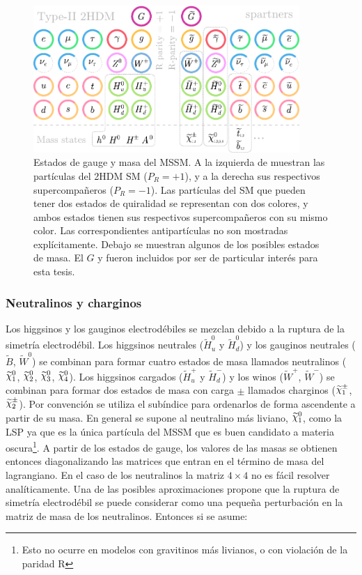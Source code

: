 \begin{figure}
  \centering
  \includegraphics[width=0.9\textwidth]{images/theory/sm_susy_v2.pdf}
  \caption{Estados de gauge y masa del MSSM. A la izquierda de muestran las partículas del 2HDM SM ($P_R = +1$), y a la derecha sus respectivos supercompañeros ($P_R = -1$). Las partículas del SM que pueden tener dos estados de quiralidad se representan con dos colores, y ambos estados tienen sus respectivos supercompañeros con su mismo color. Las correspondientes antipartículas no son mostradas explícitamente. Debajo se muestran algunos de los posibles estados de masa. El $G$ y \gravino fueron incluidos por ser de particular interés para esta tesis.}
  \label{fig:susy_part}
\end{figure}

\subsubsection{Neutralinos y charginos}

Los higgsinos y los gauginos electrodébiles se mezclan debido a la ruptura de la simetría electrodébil. Los higgsinos neutrales ($\widetilde{H}_u^0$ y $\widetilde{H}_d^0$) y los gauginos neutrales ($\widetilde{B}$, $\widetilde{W}^0$) se combinan para formar cuatro estados de masa llamados neutralinos ($\ninoone$, $\ninotwo$, $\ninothree$, $\ninofour$). Los higgsinos cargados ($\widetilde{H}_u^+$ y $\widetilde{H}_d^-$) y los winos ($\widetilde{W}^+$, $\widetilde{W}^-$) se combinan para formar dos estados de masa con carga $\pm$ llamados charginos ($\chinoonepm$, $\chinotwopm$). Por convención se utiliza el subíndice para ordenarlos de forma ascendente a partir de su masa. En general se supone al neutralino más liviano, $\ninoone$, como la LSP ya que es la única partícula del MSSM que es buen candidato a materia oscura\footnote{Esto no ocurre en modelos con gravitinos más livianos, o con violación de la paridad R}. A partir de los estados de gauge, los valores de las masas se obtienen entonces diagonalizando las matrices que entran en el término de masa del lagrangiano. En el caso de los neutralinos la matriz $4\times4$ no es fácil resolver analíticamente. Una de las posibles aproximaciones propone que la ruptura de simetría electrodébil se puede considerar como una pequeña perturbación en la matriz de masa de los neutralinos. Entonces si se asume: 

